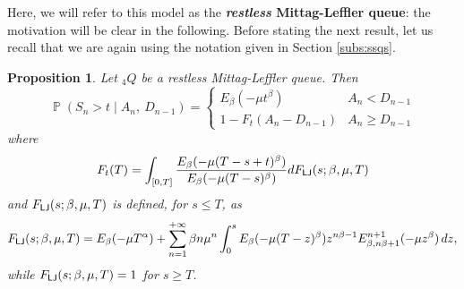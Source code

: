 \documentclass[]{amsart}
\numberwithin{equation}{section}
\newtheorem{prop}[thm]{Proposition}
\theoremstyle{remark}
\theoremstyle{definition}
\DeclareMathOperator{\N}{\mathbb{N}}
\DeclareMathOperator{\bP}{\mathbb{P}}
\begin{document}
Here, we will refer to this model as the \textbf{\textit{restless} Mittag-Leffler queue}: the motivation will be clear in the following. Before stating the next result, let us recall that we are again using the notation given in Section \ref{subs:ssqs}.
\begin{prop}\label{prop:distserv3}
	Let ${}_4Q$ be a restless Mittag-Leffler queue. Then
	\begin{equation}\label{eq:service1}
		\bP(S_{n}>t \mid A_n , \ D_{n-1})=\begin{cases} E_\beta(-\mu t^\beta) & A_n<D_{n-1} \\
			1-F_t(A_n-D_{n-1}) & A_n \ge D_{n-1}
		\end{cases}
	\end{equation}
	where
	\begin{align*}
		F_t(T)=\int_{[0,T]}\frac{E_\beta(-\mu(T-s+t)^\beta)}{E_\beta(-\mu(T-s)^\beta)}dF_{\sf LJ}(s;\beta,\mu,T)
	\end{align*}
	and $F_{\sf LJ}(s;\beta,\mu,T)$ is defined, for $s \le T$, as
	\begin{align}\label{eq:lastjumptime}
		F_{\sf LJ}(s;\beta,\mu,T)=E_\beta(-\mu T^\alpha)+\sum_{n=1}^{+\infty}\beta n \mu^n \int_0^s E_\beta(-\mu (T-z)^\beta)z^{n\beta-1}E_{\beta,n\beta+1}^{n+1}(-\mu z^\beta)\, dz,
	\end{align}
	while $F_{\sf LJ}(s;\beta,\mu,T)=1$ for $s \ge T$.
\end{prop}
\end{document}
